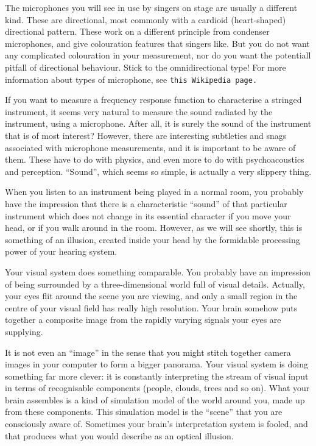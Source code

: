   The microphones you will see in use by singers on stage are usually a 
  different kind. These are directional, most commonly with a cardioid 
  (heart-shaped) directional pattern. These work on a different principle from 
  condenser microphones, and give colouration features that singers like. But 
  you do not want any complicated colouration in your measurement, nor do you 
  want the potentiall pitfall of directional behaviour. Stick to the 
  omnidirectional type! For more information about types of microphone, see \tt{}this Wikipedia page\rm{}. 

  If you want to measure a frequency response function to characterise a 
  stringed instrument, it seems very natural to measure the sound radiated by 
  the instrument, using a microphone. After all, it is surely the sound of the 
  instrument that is of most interest? However, there are interesting 
  subtleties and snags associated with microphone measurements, and it is 
  important to be aware of them. These have to do with physics, and even more 
  to do with psychoacoustics and perception. “Sound”, which seems so simple, is 
  actually a very slippery thing. 

  When you listen to an instrument being played in a normal room, you probably 
  have the impression that there is a characteristic “sound” of that particular 
  instrument which does not change in its essential character if you move your 
  head, or if you walk around in the room. However, as we will see shortly, 
  this is something of an illusion, created inside your head by the formidable 
  processing power of your hearing system. 

  Your visual system does something comparable. You probably have an impression 
  of being surrounded by a three-dimensional world full of visual details. 
  Actually, your eyes flit around the scene you are viewing, and only a small 
  region in the centre of your visual field has really high resolution. Your 
  brain somehow puts together a composite image from the rapidly varying 
  signals your eyes are supplying. 

  It is not even an “image” in the sense that you might stitch together camera 
  images in your computer to form a bigger panorama. Your visual system is 
  doing something far more clever: it is constantly interpreting the stream of 
  visual input in terms of recognisable components (people, clouds, trees and 
  so on). What your brain assembles is a kind of simulation model of the world 
  around you, made up from these components. This simulation model is the 
  ``scene'' that you are consciously aware of. Sometimes your brain's 
  interpretation system is fooled, and that produces what you would describe as 
  an optical illusion. 

